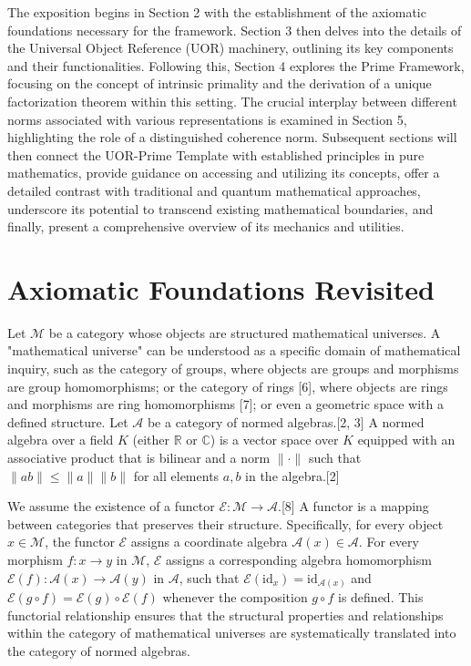 \documentclass{article}
\begin{document}
The exposition begins in Section 2 with the establishment of the axiomatic foundations necessary for the framework. Section 3 then delves into the details of the Universal Object Reference (UOR) machinery, outlining its key components and their functionalities. Following this, Section 4 explores the Prime Framework, focusing on the concept of intrinsic primality and the derivation of a unique factorization theorem within this setting. The crucial interplay between different norms associated with various representations is examined in Section 5, highlighting the role of a distinguished coherence norm. Subsequent sections will then connect the UOR-Prime Template with established principles in pure mathematics, provide guidance on accessing and utilizing its concepts, offer a detailed contrast with traditional and quantum mathematical approaches, underscore its potential to transcend existing mathematical boundaries, and finally, present a comprehensive overview of its mechanics and utilities.

\section{Axiomatic Foundations Revisited}

Let $\mathcal{M}$ be a category whose objects are structured mathematical universes. A "mathematical universe" can be understood as a specific domain of mathematical inquiry, such as the category of groups, where objects are groups and morphisms are group homomorphisms; or the category of rings [6], where objects are rings and morphisms are ring homomorphisms [7]; or even a geometric space with a defined structure. Let $\mathcal{A}$ be a category of normed algebras.[2, 3] A normed algebra over a field $K$ (either $\mathbb{R}$ or $\mathbb{C}$) is a vector space over $K$ equipped with an associative product that is bilinear and a norm $\|\cdot\|$ such that $\|ab\| \leq \|a\|\|b\|$ for all elements $a, b$ in the algebra.[2]

We assume the existence of a functor $\mathcal{E} : \mathcal{M} \to \mathcal{A}$.[8] A functor is a mapping between categories that preserves their structure. Specifically, for every object $x \in \mathcal{M}$, the functor $\mathcal{E}$ assigns a coordinate algebra $\mathcal{A}(x) \in \mathcal{A}$. For every morphism $f: x \to y$ in $\mathcal{M}$, $\mathcal{E}$ assigns a corresponding algebra homomorphism $\mathcal{E}(f): \mathcal{A}(x) \to \mathcal{A}(y)$ in $\mathcal{A}$, such that $\mathcal{E}(\text{id}_x) = \text{id}_{\mathcal{A}(x)}$ and $\mathcal{E}(g \circ f) = \mathcal{E}(g) \circ \mathcal{E}(f)$ whenever the composition $g \circ f$ is defined. This functorial relationship ensures that the structural properties and relationships within the category of mathematical universes are systematically translated into the category of normed algebras.
\end{document}

